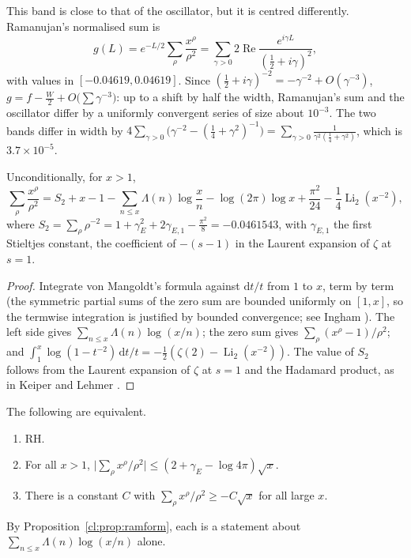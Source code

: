 This band is close to that of the oscillator, but it is centred differently. Ramanujan's normalised sum is
\[
g(L)=e^{-L/2}\sum_\rho\frac{x^\rho}{\rho^2}=\sum_{\gamma>0}2\operatorname{Re}\frac{e^{i\gamma L}}{(\frac12+i\gamma)^2},
\]
with values in $[-0.04619,0.04619]$. Since $(\frac12+i\gamma)^{-2}=-\gamma^{-2}+O(\gamma^{-3})$, $g=f-\frac W2+O\bigl(\sum\gamma^{-3}\bigr)$: up to a shift by half the width, Ramanujan's sum and the oscillator differ by a uniformly convergent series of size about $10^{-3}$. The two bands differ in width by $4\sum_{\gamma>0}\bigl(\gamma^{-2}-(\frac14+\gamma^2)^{-1}\bigr)=\sum_{\gamma>0}\frac1{\gamma^2(\frac14+\gamma^2)}$, which is $3.7\times10^{-5}$.

\begin{proposition}\label{cl:prop:ramform}
Unconditionally, for $x>1$,
\[
\sum_\rho\frac{x^\rho}{\rho^2}=S_2+x-1-\sum_{n\le x}\Lambda(n)\log\frac xn-\log(2\pi)\log x+\frac{\pi^2}{24}-\frac14\operatorname{Li}_2(x^{-2}),
\]
where $S_2=\sum_\rho\rho^{-2}=1+\gamma_E^2+2\gamma_{E,1}-\frac{\pi^2}8=-0.0461543$, with $\gamma_{E,1}$ the first Stieltjes constant, the coefficient of $-(s-1)$ in the Laurent expansion of $\zeta$ at $s=1$.
\end{proposition}

\begin{proof}
Integrate von Mangoldt's formula against $\mathrm{d}t/t$ from $1$ to $x$, term by term (the symmetric partial sums of the zero sum are bounded uniformly on $[1,x]$, so the termwise integration is justified by bounded convergence; see Ingham \cite{Ingham32}). The left side gives $\sum_{n\le x}\Lambda(n)\log(x/n)$; the zero sum gives $\sum_\rho(x^\rho-1)/\rho^2$; and $\int_1^x\log(1-t^{-2})\,\mathrm{d}t/t=-\frac12(\zeta(2)-\operatorname{Li}_2(x^{-2}))$. The value of $S_2$ follows from the Laurent expansion of $\zeta$ at $s=1$ and the Hadamard product, as in Keiper \cite{Keiper92} and Lehmer \cite{Lehmer88}.
\end{proof}

\begin{theorem}\label{cl:thm:band}
The following are equivalent.
\begin{enumerate}
\item RH.
\item For all $x>1$, $\bigl|\sum_\rho x^\rho/\rho^2\bigr|\le(2+\gamma_E-\log4\pi)\sqrt x$.
\item There is a constant $C$ with $\sum_\rho x^\rho/\rho^2\ge-C\sqrt x$ for all large $x$.
\end{enumerate}
By Proposition~\ref{cl:prop:ramform}, each is a statement about $\sum_{n\le x}\Lambda(n)\log(x/n)$ alone.
\end{theorem}

